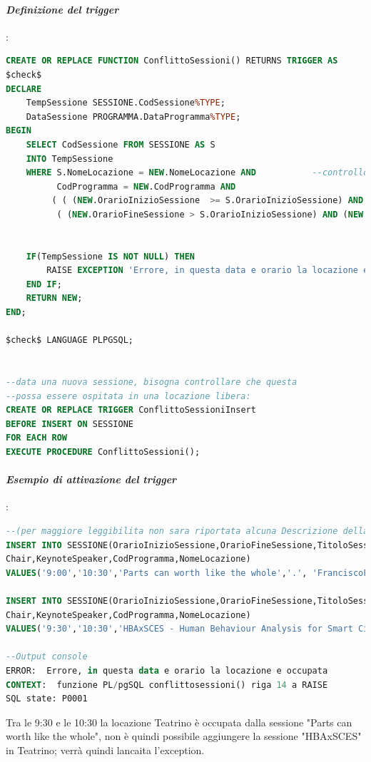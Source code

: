 \documentclass[a4page]{article}
\begin{document}
\paragraph{\textit{Definizione del trigger}}:
\begin{lstlisting}[language=SQL,
        deletekeywords={IDENTITY,INT},
        morekeywords={clustered},    
        framesep=10pt,
        framextopmargin=10pt]
CREATE OR REPLACE FUNCTION ConflittoSessioni() RETURNS TRIGGER AS
$check$
DECLARE 
	TempSessione SESSIONE.CodSessione%TYPE;
	DataSessione PROGRAMMA.DataProgramma%TYPE;		
BEGIN
	SELECT CodSessione FROM SESSIONE AS S
	INTO TempSessione
	WHERE S.NomeLocazione = NEW.NomeLocazione AND			--controllo che la locazione non sia gia' occupata a quella data e ora
		  CodProgramma = NEW.CodProgramma AND
		 ( ( (NEW.OrarioInizioSessione  >= S.OrarioInizioSessione) AND (NEW.OrarioInizioSessione  < S.OrarioFineSessione) ) OR
		  ( (NEW.OrarioFineSessione > S.OrarioInizioSessione) AND (NEW.OrarioFineSessione <= S.OrarioFineSessione) ) );
		  
	
	IF(TempSessione IS NOT NULL) THEN
		RAISE EXCEPTION 'Errore, in questa data e orario la locazione e occupata';
	END IF;
	RETURN NEW;
END;

$check$ LANGUAGE PLPGSQL;		


--data una nuova sessione, bisogna controllare che questa
--possa essere ospitata in una locazione libera:
CREATE OR REPLACE TRIGGER ConflittoSessioniInsert
BEFORE INSERT ON SESSIONE
FOR EACH ROW
EXECUTE PROCEDURE ConflittoSessioni();          
\end{lstlisting}
\paragraph{\textit{Esempio di attivazione del trigger}}:
\begin{lstlisting}[language=SQL,
        deletekeywords={IDENTITY,INT},
        morekeywords={clustered},    
        framesep=10pt,
        framextopmargin=10pt]
--(per maggiore leggibilita non sara riportata alcuna Descrizione della sessione).
INSERT INTO SESSIONE(OrarioInizioSessione,OrarioFineSessione,TitoloSessione,DescrizioneSessione,
Chair,KeynoteSpeaker,CodProgramma,NomeLocazione)
VALUES('9:00','10:30','Parts can worth like the whole','.', 'FranciscoFlorez-Revuelta@gmail.com','NicolaLerme@unipa.it',0,'Teatrino');
	   
INSERT INTO SESSIONE(OrarioInizioSessione,OrarioFineSessione,TitoloSessione,DescrizioneSessione,
Chair,KeynoteSpeaker,CodProgramma,NomeLocazione)
VALUES('9:30','10:30','HBAxSCES - Human Behaviour Analysis for Smart City Environment Safety','.','JonAnderGomezAdrian@gmail.com','GiovanniRana@gmail.com',0,'Teatrino');

--Output console
ERROR:  Errore, in questa data e orario la locazione e occupata
CONTEXT:  funzione PL/pgSQL conflittosessioni() riga 14 a RAISE
SQL state: P0001
\end{lstlisting}
\vspace{1cm}
Tra le 9:30 e le 10:30 la locazione Teatrino è occupata dalla sessione "Parts can worth like the whole", non è quindi possibile aggiungere la sessione "HBAxSCES" in Teatrino; verrà quindi lancaita l'exception.
\end{document}
